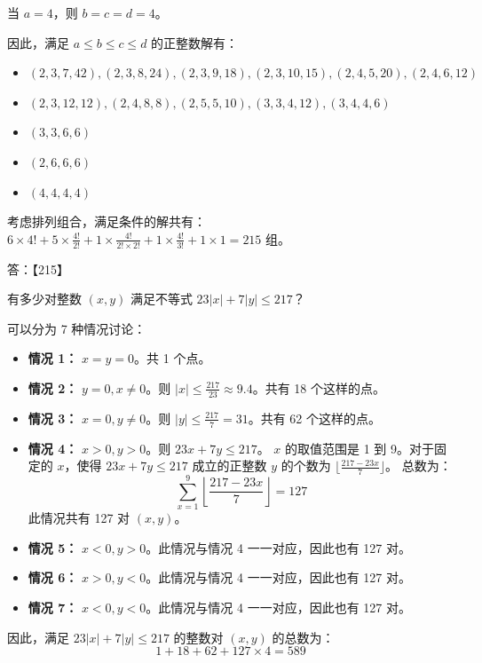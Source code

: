 \begin{questions}
\begin{solution}
当 $a=4$，则 $b=c=d=4$。

因此，满足 $a \le b \le c \le d$ 的正整数解有：
\begin{itemize}
    \item $(2, 3, 7, 42), (2, 3, 8, 24), (2, 3, 9, 18), (2, 3, 10, 15), (2, 4, 5, 20), (2, 4, 6, 12)$
    \item $(2, 3, 12, 12), (2, 4, 8, 8), (2, 5, 5, 10), (3, 3, 4, 12), (3, 4, 4, 6)$
    \item $(3, 3, 6, 6)$
    \item $(2, 6, 6, 6)$
    \item $(4, 4, 4, 4)$
\end{itemize}
考虑排列组合，满足条件的解共有：
$6 \times 4! + 5 \times \frac{4!}{2!} + 1 \times \frac{4!}{2! \times 2!} + 1 \times \frac{4!}{3!} + 1 \times 1 = 215$ 组。

答：【215】
\end{solution}

\question 有多少对整数 $(x, y)$ 满足不等式 $23|x| + 7|y| \le 217$？

\begin{solution}
可以分为 7 种情况讨论：
\begin{itemize}
    \item \textbf{情况 1：} $x = y = 0$。共 1 个点。
    \item \textbf{情况 2：} $y = 0, x \neq 0$。则 $|x| \le \frac{217}{23} \approx 9.4$。共有 18 个这样的点。
    \item \textbf{情况 3：} $x = 0, y \neq 0$。则 $|y| \le \frac{217}{7} = 31$。共有 62 个这样的点。
    \item \textbf{情况 4：} $x > 0, y > 0$。则 $23x + 7y \le 217$。
    $x$ 的取值范围是 1 到 9。对于固定的 $x$，使得 $23x + 7y \le 217$ 成立的正整数 $y$ 的个数为 $\lfloor \frac{217 - 23x}{7} \rfloor$。
    总数为：
    \[
    \sum_{x=1}^{9} \left\lfloor \frac{217 - 23x}{7} \right\rfloor = 127
    \]
    此情况共有 127 对 $(x, y)$。
    \item \textbf{情况 5：} $x < 0, y > 0$。此情况与情况 4 一一对应，因此也有 127 对。
    \item \textbf{情况 6：} $x > 0, y < 0$。此情况与情况 4 一一对应，因此也有 127 对。
    \item \textbf{情况 7：} $x < 0, y < 0$。此情况与情况 4 一一对应，因此也有 127 对。
\end{itemize}
因此，满足 $23|x| + 7|y| \le 217$ 的整数对 $(x, y)$ 的总数为：
\[
1 + 18 + 62 + 127 \times 4 = 589
\]
\end{solution}


\end{questions}
